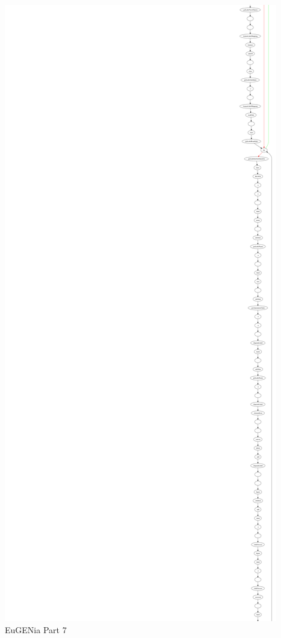 \begin{minipage}[b]{\textwidth}
\centering
\includegraphics[height=0.97\textheight]{./figures/eug_7.png}
EuGENia Part 7
\end{minipage}
